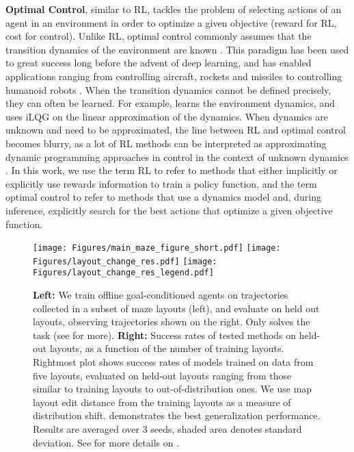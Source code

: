 \textbf{Optimal Control}, similar to RL, tackles the problem of selecting actions 
of an agent in an environment in order to optimize a given objective (reward for RL, cost for control). Unlike RL, optimal control commonly assumes that the transition dynamics of the environment are known \citep{Bertsekas2019}. This paradigm has been used to great success long before the advent of deep learning, and has enabled applications ranging from controlling aircraft, rockets and missiles \citep{bryson1996optimal} to controlling humanoid robots \citep{kuindersma2016optimization, schultz2009modeling}. When the transition dynamics cannot be defined precisely, they can often be learned. For example, \citep{Watter_Springenberg_Boedecker_Riedmiller_2015} learns the environment dynamics, and uses iLQG \citep{todorov2005generalized} on the linear approximation of the dynamics.
When dynamics are unknown and need to be approximated, 
the line between RL and optimal control becomes blurry, as a lot of RL methods can be interpreted as approximating dynamic programming approaches in control in the context of unknown dynamics \citep{bertsekas2012dynamic, sutton2018reinforcement}.  
In this work, we use the term RL to refer to methods that either implicitly or explicitly use rewards information to train a policy function, and the term optimal control to refer to methods that use a dynamics model and, during inference, explicitly search for the best actions that optimize a given objective function. 

\begin{figure}[t]
    \centering
    \texttt{[image: Figures/main\_maze\_figure\_short.pdf]}
    \texttt{[image: Figures/layout\_change\_res.pdf]}
    \texttt{[image: Figures/layout\_change\_res\_legend.pdf]}
    \caption{\textbf{Left:} We train offline goal-conditioned agents on trajectories collected in a subset of maze layouts (left), and evaluate on held out layouts, observing trajectories shown on the right. Only \JEPA{} solves the task (see  for more). \textbf{Right:} Success rates of tested methods on held-out layouts, as a function of the number of training layouts. Rightmost plot shows success rates of models trained on data from five layouts,
    evaluated on held-out layouts ranging from those similar to training layouts to out-of-distribution ones. We use map layout edit distance from the training layouts as a measure of distribution shift. \JEPA{} demonstrates the best generalization performance. Results are averaged over 3 seeds, shaded area denotes standard deviation. See  for more details on \JEPA{}.}
    \label{fig:maze_main_figure}
\end{figure}

